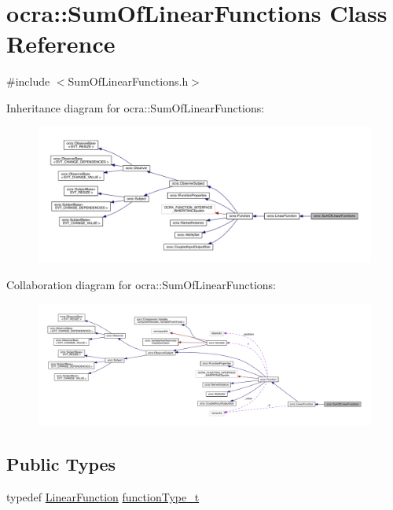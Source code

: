\hypertarget{classocra_1_1SumOfLinearFunctions}{}\section{ocra\+:\+:Sum\+Of\+Linear\+Functions Class Reference}
\label{classocra_1_1SumOfLinearFunctions}


{\ttfamily \#include $<$Sum\+Of\+Linear\+Functions.\+h$>$}



Inheritance diagram for ocra\+:\+:Sum\+Of\+Linear\+Functions\+:\nopagebreak
\begin{figure}[H]
\begin{center}
\leavevmode
\includegraphics[width=350pt]{d0/d7c/classocra_1_1SumOfLinearFunctions__inherit__graph}
\end{center}
\end{figure}


Collaboration diagram for ocra\+:\+:Sum\+Of\+Linear\+Functions\+:\nopagebreak
\begin{figure}[H]
\begin{center}
\leavevmode
\includegraphics[width=350pt]{d9/d3f/classocra_1_1SumOfLinearFunctions__coll__graph}
\end{center}
\end{figure}
\subsection*{Public Types}
\begin{DoxyCompactItemize}
\item 
typedef \hyperlink{classocra_1_1LinearFunction}{Linear\+Function} \hyperlink{classocra_1_1SumOfLinearFunctions_ae7f2c949cbda9d69d13e64e5bfeb5fa9}{function\+Type\+\_\+t}
\end{DoxyCompactItemize}
